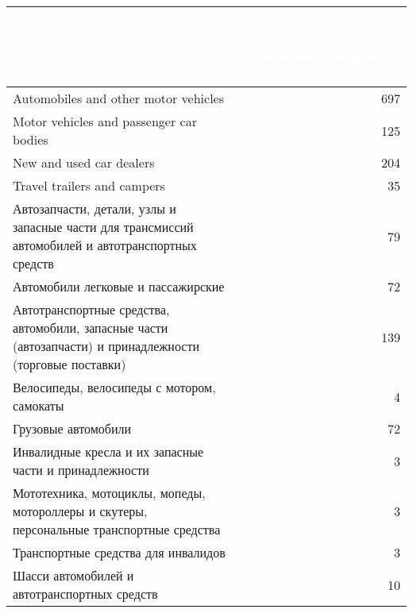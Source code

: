 \footnotesize{
\begin{tabularx}{\textwidth}{|X|r|}
    \hline
\rowcolor{black} \textcolor{white}{\textbf{Категория товара}} & \textcolor{white}{\textbf{Количество экспортирующая компаний, доступных в Trade Map}} \\ \hline
Automobiles and other motor vehicles & 697 \\ \hline
Motor vehicles and passenger car bodies & 125 \\ \hline
New and used car dealers & 204 \\ \hline
Travel trailers and campers & 35 \\ \hline
Автозапчасти, детали, узлы и запасные части для трансмиссий автомобилей и автотранспортных средств & 79 \\ \hline
Автомобили легковые и пассажирские & 72 \\ \hline
Автотранспортные средства, автомобили, запасные части (автозапчасти) и принадлежности (торговые поставки) & 139 \\ \hline
Велосипеды, велосипеды с мотором, самокаты & 4 \\ \hline
Грузовые автомобили & 72 \\ \hline
Инвалидные кресла и их запасные части и принадлежности & 3 \\ \hline
Мототехника, мотоциклы, мопеды, мотороллеры и скутеры, персональные транспортные средства & 3 \\ \hline
Транспортные средства для инвалидов & 3 \\ \hline
Шасси автомобилей и автотранспортных средств & 10 \\ \hline
\end{tabularx}
}